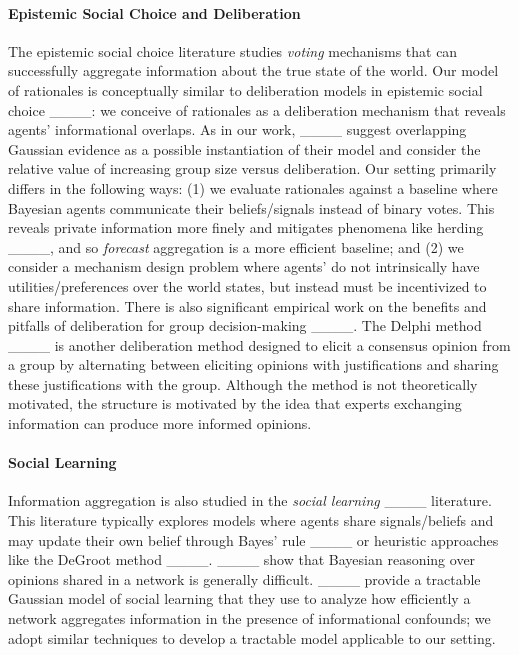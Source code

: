 \paragraph{Epistemic Social Choice and Deliberation} The epistemic social choice literature studies \emph{voting} mechanisms that can successfully aggregate information about the true state of the world.  
Our model of rationales is conceptually similar to deliberation models in epistemic social choice ____\@: we conceive of rationales as a deliberation mechanism that reveals agents' informational overlaps. As in our work, ____ suggest overlapping Gaussian evidence as a possible instantiation of their model and consider the relative value of increasing group size versus deliberation. Our setting primarily differs in the following ways: (1) we evaluate rationales against a baseline where Bayesian agents communicate their beliefs/signals instead of binary votes. This reveals private information more finely and mitigates phenomena like herding ____, and so \emph{forecast} aggregation is a more efficient baseline; and (2) we consider a mechanism design problem where agents' do not intrinsically have utilities/preferences over the world states, but instead must be incentivized to share information. There is also significant empirical work on the benefits and pitfalls of deliberation for group decision-making ____. The Delphi method ____ is another deliberation method designed to elicit a consensus opinion from a group by alternating between eliciting opinions with justifications and sharing these justifications with the group. Although the method is not theoretically motivated, the structure is motivated by the idea that experts exchanging information can produce more informed opinions. 

\paragraph{Social Learning}  Information aggregation is also studied in the \emph{social learning} ____ literature. This literature typically explores models where agents share signals/beliefs and may update their own belief through Bayes' rule ____ or heuristic approaches like the DeGroot method ____. ____ show that Bayesian reasoning over opinions shared in a network is generally difficult. ____ provide a tractable Gaussian model of social learning that they use to analyze how efficiently a network aggregates information in the presence of informational confounds; we adopt similar techniques to develop a tractable model applicable to our setting.

